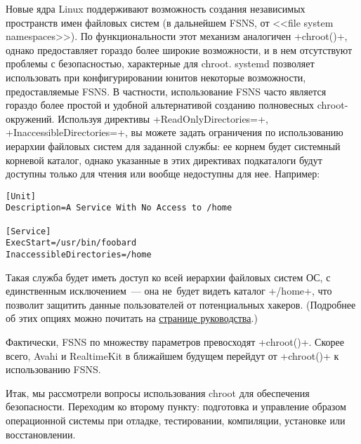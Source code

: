 \documentclass[10pt,oneside,a4paper]{article}
\begin{document}
Новые ядра Linux поддерживают возможность создания независимых пространств имен
файловых систем (в дальнейшем FSNS, от <<file system namespaces>>). По
функциональности этот механизм аналогичен +chroot()+, однако предоставляет
гораздо более широкие возможности, и в нем отсутствуют проблемы с безопасностью,
характерные для chroot. systemd позволяет использовать при конфигурировании
юнитов некоторые возможности, предоставляемые FSNS. В частности, использование
FSNS часто является гораздо более простой и удобной альтернативой созданию
полновесных chroot-окружений. Используя директивы +ReadOnlyDirectories=+,
+InaccessibleDirectories=+, вы можете задать ограничения по использованию
иерархии файловых систем для заданной службы: ее корнем будет системный корневой
каталог, однако указанные в этих директивах подкаталоги будут доступны только 
для чтения или вообще недоступны для нее. Например:
\begin{Verbatim}
[Unit]
Description=A Service With No Access to /home

[Service]
ExecStart=/usr/bin/foobard
InaccessibleDirectories=/home
\end{Verbatim}

Такая служба будет иметь доступ ко всей иерархии файловых систем ОС, с
единственным исключением~--- она не~будет видеть каталог +/home+, что позволит
защитить данные пользователей от потенциальных хакеров. (Подробнее об этих
опциях можно почитать на
\href{http://0pointer.de/public/systemd-man/systemd.exec.html}{странице
руководства}.)

Фактически, FSNS по множеству параметров превосходят +chroot()+. Скорее всего,
Avahi и RealtimeKit в ближайшем будущем перейдут от +chroot()+ к использованию
FSNS.

Итак, мы рассмотрели вопросы использования chroot для обеспечения безопасности.
Переходим ко второму пункту: подготовка и управление образом операционной
системы при отладке, тестировании, компиляции, установке или восстановлении.
\end{document}
